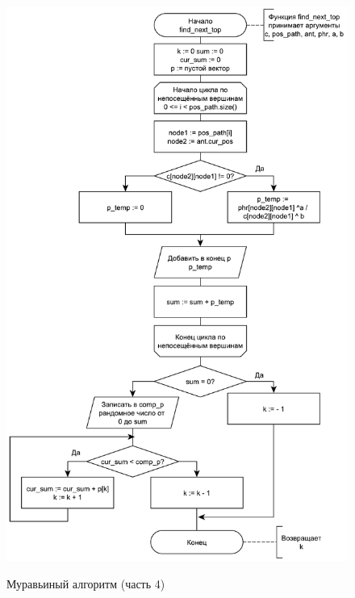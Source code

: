 \begin{figure}[h]
	\begin{center}
		{\includegraphics[scale = 0.6]{schemes/ant4}}
		\caption{Муравьиный алгоритм (часть 4)}
		\label{fig6:image}
	\end{center}
\end{figure}

